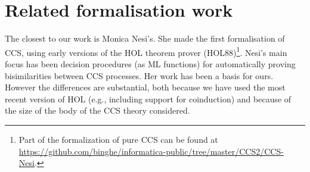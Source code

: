 \section{Related formalisation work}
\label{s:rel}
The closest to our work is Monica Nesi's.
She made the first formalisation of CCS, using
early versions of the HOL theorem prover (HOL88)\footnote{Part of
 the formalization of pure CCS can be found at \url{https://github.com/binghe/informatica-public/tree/master/CCS2/CCS-Nesi}.}.
Nesi's  main focus has been 
 decision procedures (as ML functions) for
automatically proving bisimilarities between CCS
processes.%
Her work has been a basis for ours. However the differences are
substantial, both because we have used the most recent version of HOL
(e.g., including support for coinduction) and because of the size of
the body of the CCS theory considered. 




